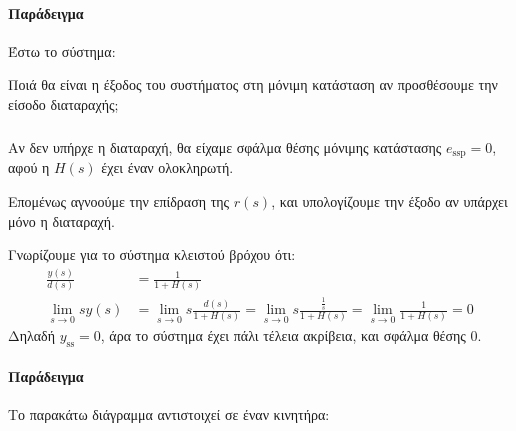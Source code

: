 \documentclass[11pt,a4paper,notitlepage,fleqn,final]{article}
\begin{document}
\paragraph{Παράδειγμα}
Έστω το σύστημα:


Ποιά θα είναι η έξοδος του συστήματος στη μόνιμη κατάσταση αν προσθέσουμε την είσοδο
διαταραχής;

\subparagraph{}

Αν δεν υπήρχε η διαταραχή, θα είχαμε σφάλμα θέσης μόνιμης κατάστασης
\( e_{\mathrm{ssp}} = 0 \), αφού η \( H(s) \) έχει έναν ολοκληρωτή.

Επομένως αγνοούμε την επίδραση της \( r(s) \), και υπολογίζουμε την έξοδο αν
υπάρχει μόνο η διαταραχή.

Γνωρίζουμε για το σύστημα κλειστού βρόχου ότι:
\begin{align*}
	\frac{y(s)}{d(s)} &= \frac{1}{1+H(s)} \\
	\lim_{s\to 0}sy(s) &= \lim_{s\to 0} s\frac{d(s)}{1+H(s)}
	= \lim_{s\to 0} s\frac{\frac{1}{s}}{1+H(s)} = \lim_{s\to 0}\frac{1}{1+H(s)} = 0
\end{align*}
Δηλαδή \( y_{\mathrm{ss}} = 0 \), άρα το σύστημα έχει πάλι τέλεια ακρίβεια, και σφάλμα θέσης
0.

\paragraph{Παράδειγμα} \hspace{0pt}

Το παρακάτω διάγραμμα αντιστοιχεί σε έναν κινητήρα:
\end{document}
